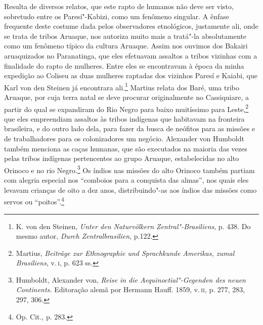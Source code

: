 
Resulta de diversos relatos, que este rapto de humanos não deve ser
visto, sobretudo entre os Paresí"-Kabizi, como um fenômeno singular. A
ênfase frequente deste costume dada pelos observadores etnológicos,
justamente ali, onde se trata de tribos Aruaque, nos autoriza muito mais
a tratá"-la absolutamente como um fenômeno típico da cultura Aruaque.
Assim nos ouvimos dos Bakairi aruaquizados no Paranatinga, que eles
efetuavam assaltos a tribos vizinhas com a finalidade do rapto de
mulheres. Entre eles se encontravam à época da minha expedição ao
Coliseu as duas mulheres raptadas dos vizinhos Paresí e Kaiabi, que Karl
von den Steinen já encontrara ali.\footnote{K. von den Steinen,
  \emph{Unter den Naturvölkern Zentral"-Brasiliens}, p. 438. Do mesmo
  autor, \emph{Durch Zentralbrasilien}, p.122.} Martius relata dos
Baré, uma tribo Aruaque, por cuja terra natal se deve procurar
originalmente no Cassiquiare, a partir do qual se expandiram do Rio
Negro para baixo muitíssimo para Leste,\footnote{Martius, \emph{Beiträge
  zur Ethnographie und Sprachkunde Amerikas, zumal Brasiliens}, v.\,\textsc{i},
  p. 623 ss.} que eles empreendiam assaltos às tribos indígenas que
habitavam na fronteira brasileira, e do outro lado dela, para fazer da
busca de neófitos para as missões e de trabalhadores para os
colonizadores um negócio. Alexander von Humboldt também menciona as
caças humanas, que são executados na maioria das vezes pelas tribos
indígenas pertencentes ao grupo Aruaque, estabelecidas no alto Orinoco e
no rio Negro.\footnote{Humboldt, Alexander von, \emph{Reise in die
  Aequinoctial"-Gegenden des neuen Continents.} Editoração alemã por
  Hermann Hauff. 1859, v.\,\textsc{ii}, p. 277, 283, 297, 306.} Os índios nas
missões do alto Orinoco também partiam com alegria especial nos
``comboios para a conquista das almas'', nos quais eles levavam
crianças de oito a dez anos, distribuindo"-as aos índios das missões como
servos ou ``poitos''.\footnote{Op. Cit., p. 283.}

